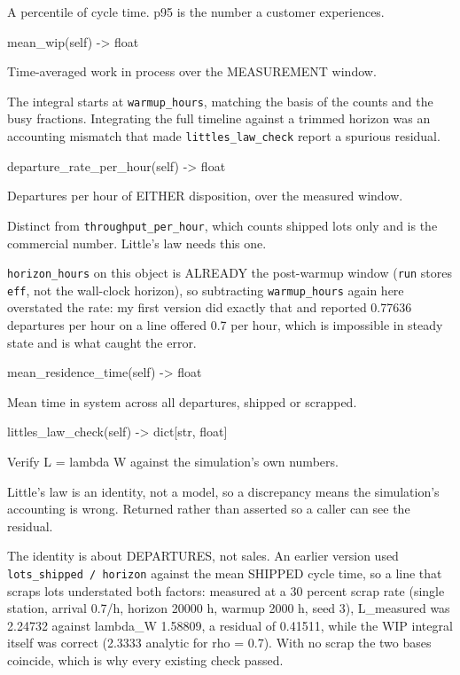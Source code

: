\documentclass[10pt,a4paper,twoside]{report}
\begin{document}
A percentile of cycle time. p95 is the number a customer experiences.

\begin{verbatimsmall}
mean_wip(self) -> float
\end{verbatimsmall}

Time-averaged work in process over the MEASUREMENT window.

The integral starts at \texttt{warmup\_hours}, matching the basis of the counts and the busy fractions. Integrating the full timeline against a trimmed horizon was an accounting mismatch that made \texttt{littles\_law\_check} report a spurious residual.

\begin{verbatimsmall}
departure_rate_per_hour(self) -> float
\end{verbatimsmall}

Departures per hour of EITHER disposition, over the measured window.

Distinct from \texttt{throughput\_per\_hour}, which counts shipped lots only and is the commercial number. Little's law needs this one.

\texttt{horizon\_hours} on this object is ALREADY the post-warmup window (\texttt{run} stores \texttt{eff}, not the wall-clock horizon), so subtracting \texttt{warmup\_hours} again here overstated the rate: my first version did exactly that and reported 0.77636 departures per hour on a line offered 0.7 per hour, which is impossible in steady state and is what caught the error.

\begin{verbatimsmall}
mean_residence_time(self) -> float
\end{verbatimsmall}

Mean time in system across all departures, shipped or scrapped.

\begin{verbatimsmall}
littles_law_check(self) -> dict[str, float]
\end{verbatimsmall}

Verify L = lambda W against the simulation's own numbers.

Little's law is an identity, not a model, so a discrepancy means the simulation's accounting is wrong. Returned rather than asserted so a caller can see the residual.

The identity is about DEPARTURES, not sales. An earlier version used \texttt{lots\_shipped / horizon} against the mean SHIPPED cycle time, so a line that scraps lots understated both factors: measured at a 30 percent scrap rate (single station, arrival 0.7/h, horizon 20000 h, warmup 2000 h, seed 3), L\_measured was 2.24732 against lambda\_W 1.58809, a residual of 0.41511, while the WIP integral itself was correct (2.3333 analytic for rho = 0.7). With no scrap the two bases coincide, which is why every existing check passed.
\end{document}
